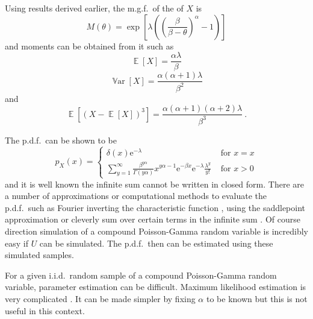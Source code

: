 \documentclass[12pt, a4paper]{memoir}
\DeclareMathOperator{\expectation}{\mathbb{E}}
\DeclareMathOperator{\variance}{\mathbb{V}ar}
\newcommand{\euler}{\mathrm{e}}
\begin{document}
Using results derived earlier, the m.g.f.~of the of $X$ is
\begin{equation}
M(\theta)=\exp\left[\lambda\left(\left(\frac{\beta}{\beta-\theta}\right)^{\alpha}-1\right)\right]
\end{equation}
and moments can be obtained from it such as
\begin{equation}
\expectation\left[X\right]=\frac{\alpha\lambda}{\beta}
\end{equation}
\begin{equation}
\variance\left[X\right]=\frac{\alpha(\alpha+1)\lambda}{\beta^2}
\label{eq:compoundPoisson_variance}
\end{equation}
and
\begin{equation}
\expectation\left[(X-\expectation[X])^3\right] = \frac{\alpha(\alpha+1)(\alpha+2)\lambda}{\beta^3} \ .
\end{equation}

The p.d.f.~can be shown to be
\begin{equation}
p_X(x) = 
\begin{cases}
\delta(x) \euler^{-\lambda} & \text{ for } x=x \\ 
\sum_{y=1}^{\infty}\frac{\beta^{y\alpha}}{\Gamma(y\alpha)}x^{y\alpha-1}\euler^{-\beta x}\euler^{-\lambda}\frac{\lambda^y}{y!} & \text{ for } x>0
\end{cases}
\label{eq:compoundPoisson_pdf}
\end{equation}
and it is well known the infinite sum cannot be written in closed form. There are a number of approximations or computational methods to evaluate the p.d.f.~such as Fourier inverting the characteristic function \citep{dunn2008evaluation}, using the saddlepoint approximation \citep{daniels1954saddlepoint} or cleverly sum over certain terms in the infinite sum \citep{dunn2005series}. Of course direction simulation of a compound Poisson-Gamma random variable is incredibly easy if $U$ can be simulated. The p.d.f.~then can be estimated using these simulated samples.

For a given i.i.d.~random sample of a compound Poisson-Gamma random variable, parameter estimation can be difficult. Maximum likelihood estimation is very complicated \citep{withers2011compound}. It can be made simpler by fixing $\alpha$ to be known \citep{withers2011compound} but this is not useful in this context.
\end{document}

